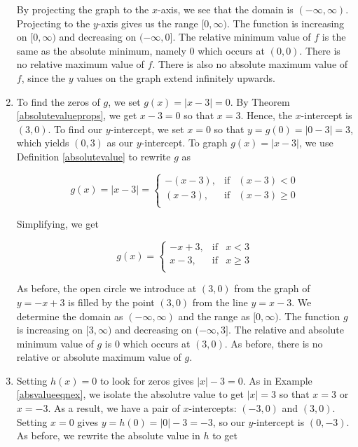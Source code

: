 \begin{ex}
\begin{enumerate}
\begin{center}
\end{center}

By projecting the graph to the $x$-axis, we see that the domain is $(-\infty, \infty)$.  Projecting to the $y$-axis gives us the range $[0,\infty)$.  The function is increasing on $[0,\infty)$ and decreasing on $(-\infty,0]$.  The relative minimum value of $f$ is the same as the absolute minimum, namely $0$ which occurs at $(0,0)$.  There is no relative maximum value of $f$.  There is also no absolute maximum value of $f$, since the $y$ values on the graph extend infinitely upwards.

\item  To find the zeros of $g$, we set $g(x) = |x-3|=0$.  By Theorem \ref{absolutevalueprops}, we get $x-3=0$ so that $x=3$.  Hence, the $x$-intercept is $(3,0)$.  To find our $y$-intercept, we set $x=0$ so that $y = g(0) = |0-3| = 3$, which yields $(0,3)$ as our $y$-intercept.  To graph $g(x) = |x-3|$, we use Definition \ref{absolutevalue} to rewrite $g$ as

\[ g(x) = |x-3| =  \left\{ \begin{array}{rcl} -(x-3), & \mbox{if} & (x-3) < 0  \\ (x-3), & \mbox{if} & (x -3) \geq 0 \\ \end{array} \right.\]

Simplifying, we get

\[ g(x) =\left\{ \begin{array}{rcl} -x+3, & \mbox{if} & x<3  \\ x-3, & \mbox{if} & x \geq 3 \\ \end{array} \right.\]



As before, the open circle we introduce at $(3,0)$ from the graph of $y = -x+3$ is filled by the point $(3,0)$ from the line $y = x-3$. We determine the domain as $(-\infty, \infty)$ and the range as $[0,\infty)$.  The function $g$ is increasing on $[3,\infty)$ and decreasing on $(-\infty,3]$.  The relative and absolute minimum value of $g$ is $0$ which occurs at $(3,0)$.  As before, there is no relative or absolute maximum value of $g$.

\item  Setting $h(x) = 0$ to look for zeros gives $|x|-3=0$. As in Example \ref{absvalueeqnex},  we isolate the absolutre value to get  $|x| = 3$ so that $x =3$ or $x=-3$.  As a result, we have a pair of $x$-intercepts:  $(-3,0)$ and $(3,0)$.  Setting $x=0$ gives $y = h(0) = |0|-3 = -3$, so our $y$-intercept is $(0,-3)$.  As before, we rewrite the absolute value in $h$ to get


\end{enumerate}
\end{ex}
